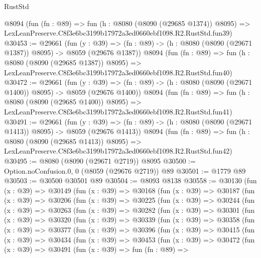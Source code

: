 \begin{lexlean}{RustStd}
\begin{coremodule}
    @8094
    (fun (fn : @89) =>
    fun (h : @8080 (@8090 (@29685 @1374)) @8095) =>
    LexLeanPreserve.C8f3e6bc3199b17972a3ed0660ebf1098.R2.RustStd.fun39)
@30453 := @29661
    (fun (y : @39) =>
    (fn : @89) -> (h : @8080 (@8090 (@29671 @1387)) @8095) -> @8059 (@29676 @1387))
    @8094
    (fun (fn : @89) =>
    fun (h : @8080 (@8090 (@29685 @1387)) @8095) =>
    LexLeanPreserve.C8f3e6bc3199b17972a3ed0660ebf1098.R2.RustStd.fun40)
@30472 := @29661
    (fun (y : @39) =>
    (fn : @89) -> (h : @8080 (@8090 (@29671 @1400)) @8095) -> @8059 (@29676 @1400))
    @8094
    (fun (fn : @89) =>
    fun (h : @8080 (@8090 (@29685 @1400)) @8095) =>
    LexLeanPreserve.C8f3e6bc3199b17972a3ed0660ebf1098.R2.RustStd.fun41)
@30491 := @29661
    (fun (y : @39) =>
    (fn : @89) -> (h : @8080 (@8090 (@29671 @1413)) @8095) -> @8059 (@29676 @1413))
    @8094
    (fun (fn : @89) =>
    fun (h : @8080 (@8090 (@29685 @1413)) @8095) =>
    LexLeanPreserve.C8f3e6bc3199b17972a3ed0660ebf1098.R2.RustStd.fun42)
@30495 := @8080 (@8090 (@29671 @2719)) @8095
@30500 := Option.noConfusion.{0, 0} (@8059 (@29676 @2719)) @89
@30501 := @1779 @89
@30503 := @30500 @30501 @89
@30504 := @8093 @8138
@30558 := @30130
    (fun (x : @39) =>
    @30149
      (fun (x : @39) =>
      @30168
        (fun (x : @39) =>
        @30187
          (fun (x : @39) =>
          @30206
            (fun (x : @39) =>
            @30225
              (fun (x : @39) =>
              @30244
                (fun (x : @39) =>
                @30263
                  (fun (x : @39) =>
                  @30282
                    (fun (x : @39) =>
                    @30301
                      (fun (x : @39) =>
                      @30320
                        (fun (x : @39) =>
                        @30339
                          (fun (x : @39) =>
                          @30358
                            (fun (x : @39) =>
                            @30377
                              (fun (x : @39) =>
                              @30396
                                (fun (x : @39) =>
                                @30415
                                  (fun (x : @39) =>
                                  @30434
                                    (fun (x : @39) =>
                                    @30453
                                      (fun (x : @39) =>
                                      @30472
                                        (fun (x : @39) =>
                                        @30491
                                          (fun (x : @39) =>
                                          fun (fn : @89) =>

\end{coremodule}
\end{lexlean}
